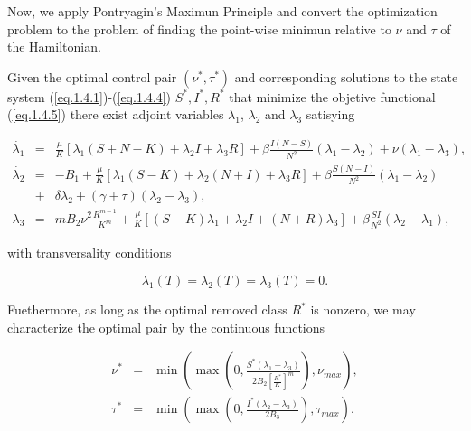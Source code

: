 Now, we apply Pontryagin's Maximun Principle and convert the optimization 
problem to the problem of finding the point-wise minimun relative to $\nu$ and 
$\tau$ of the Hamiltonian.

\begin{theorem}
Given the optimal control pair $(\nu^*,\tau^*)$ and corresponding solutions to 
the state system (\ref{eq.1.4.1})-(\ref{eq.1.4.4}) $S^*,I^*,R^*$ that minimize 
the objetive functional (\ref{eq.1.4.5}) there exist adjoint variables 
$\lambda_1$, $\lambda_2$ and $\lambda_3$ satisying

\begin{eqnarray}\label{eq.1.4.adj}
\dot{\lambda_1}&=& \frac{\mu}{K}[\lambda_1(S+N-K)+\lambda_2 I+\lambda_3 
R]+\beta \frac{I(N-S)}{N^2}(\lambda_1-\lambda_2)+\nu(\lambda_1-\lambda_3), 
\label{eq.1.4.10}\\
\dot{\lambda_2}&=& -B_1+\frac{\mu}{K}[\lambda_1(S-K)+\lambda_2(N+I)+\lambda_3 
R]+\beta\frac{S(N-I)}{N^2}(\lambda_1-\lambda_2)\nonumber\\
&+&\delta \lambda_2+(\gamma+\tau)(\lambda_2-\lambda_3),\label{eq.1.4.11}\\
\dot{\lambda_3}&=& mB_2 \nu^2\frac{R^{m-1}}{K^m}+\frac{\mu}{K}[(S-K)\lambda_1 
+\lambda_2 I+(N+R)\lambda_3]+\beta 
\frac{SI}{N^2}(\lambda_2-\lambda_1),\label{eq.1.4.12}
\end{eqnarray}

with transversality conditions

\begin{equation}\label{eq.1.4.13}
\lambda_1(T)=\lambda_2(T)=\lambda_3(T)=0.
\end{equation}

Fuethermore, as long as the optimal removed class $R^*$ is nonzero, we may 
characterize the optimal pair by the continuous functions

\begin{eqnarray}
\nu^*&=&\min 
\left(\max\left(0,\frac{S^*(\lambda_1-\lambda_3)}{2B_2[\frac{R^*}{K}]^m}\right),\nu_{max}\right),\nonumber\\
\tau^*&=&\min 
\left(\max\left(0,\frac{I^*(\lambda_2-\lambda_3)}{2B_3}\right),\tau_{max}\right)
 \label{eq.1.4.14}.
\end{eqnarray}
\end{theorem}

